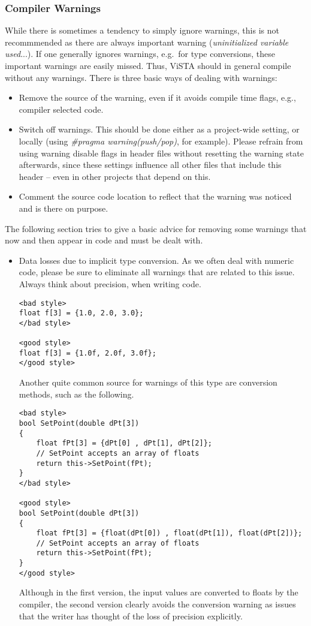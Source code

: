 \subsubsection{Compiler Warnings}
While there is sometimes a tendency to simply ignore warnings, this is not recommmended as there are always important warning (\emph{uninitialized variable used}...).
If one generally ignores warnings, e.g.\ for type conversions, these important warnings are easily missed.
Thus, ViSTA should in general compile without any warnings.
There is three basic ways of dealing with warnings:
\begin{itemize}
\item Remove the source of the warning, even if it avoids compile time flags, e.g., compiler selected code.
\item Switch off warnings. This should be done either as a project-wide setting, or locally (using \emph{\#pragma warning(push/pop)}, for example).
Please refrain from using warning disable flags in header files without resetting the warning state afterwards, since these settings influence all other files
that include this header -- even in other projects that depend on this.
\item Comment the source code location to reflect that the warning was noticed and is there on purpose.
\end{itemize}

The following section tries to give a basic advice for removing some warnings that now and then appear in code and must be dealt with.

\begin{itemize}
\item Data losses due to implicit type conversion.
	As we often deal with numeric code, please be sure to eliminate all warnings that are related to this issue.
	Always think about precision, when writing code.
\begin{verbatim}
<bad style>
float f[3] = {1.0, 2.0, 3.0};
</bad style>

<good style>
float f[3] = {1.0f, 2.0f, 3.0f};
</good style>
\end{verbatim}
	Another quite common source for warnings of this type are conversion methods, such as the following.

\begin{verbatim}
<bad style>
bool SetPoint(double dPt[3])
{
	float fPt[3] = {dPt[0] , dPt[1], dPt[2]};
	// SetPoint accepts an array of floats
	return this->SetPoint(fPt);
}
</bad style>

<good style>
bool SetPoint(double dPt[3])
{
	float fPt[3] = {float(dPt[0]) , float(dPt[1]), float(dPt[2])};
	// SetPoint accepts an array of floats
	return this->SetPoint(fPt);
}
</good style>
\end{verbatim}
	Although in the first version, the input values are converted to floats by the compiler, the second version clearly avoids the conversion warning as issues that the writer has thought of the loss of precision explicitly.
\end{itemize}


